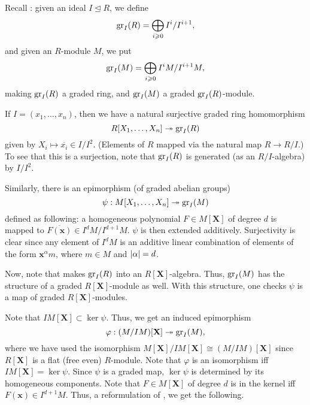 \documentclass[12pt]{article}
\begin{document}
Recall : given an ideal $I \unlhd R$, we define
\begin{equation*} 
	\operatorname{gr}_{I}(R) = \bigoplus_{i \geqslant 0} I^{i}/I^{i + 1},
\end{equation*}
and given an $R$-module $M$, we put
\begin{equation*}
	\operatorname{gr}_{I}(M) = \bigoplus_{i \geqslant 0} I^{i}M/I^{i + 1}M,
\end{equation*}
making $\operatorname{gr}_{I}(R)$ a graded ring, and $\operatorname{gr}_{I}(M)$ a graded $\operatorname{gr}_{I}(R)$-module.

If $I = (x_{1}, \ldots, x_{n})$, then we have a natural surjective graded ring homomorphism
\begin{equation} \label{eq:008}
	R[X_{1}, \ldots, X_{n}] \twoheadrightarrow \operatorname{gr}_{I}(R)
\end{equation}
given by $X_{i} \mapsto \overline{x_{i}} \in I/I^{2}$. (Elements of $R$ mapped via the natural map $R \to R/I$.) To see that this is a surjection, note that $\operatorname{gr}_{I}(R)$ is generated (as an $R/I$-algebra) by $I/I^{2}$.

Similarly, there is an epimorphism (of graded abelian groups)
\begin{equation*} 
	\psi : M[X_{1}, \ldots, X_{n}] \twoheadrightarrow \operatorname{gr}_{I}(M)
\end{equation*}
defined as following: a homogeneous polynomial $F \in M[\mathbf{X}]$ of degree $d$ is mapped to $\overline{F(\mathbf{x})} \in I^{d} M/I^{d + 1} M$. $\psi$ is then extended additively. Surjectivity is clear since any element of $I^{d} M$ is an additive linear combination of elements of the form $\mathbf{x}^{\alpha} m$, where $m \in M$ and ${\left\lvert \alpha \right\lvert} = d$.

Now, note that  makes $\operatorname{gr}_{I}(R)$ into an $R[\mathbf{X}]$-algebra. Thus, $\operatorname{gr}_{I}(M)$ has the structure of a graded $R[\mathbf{X}]$-module as well. With this structure, one checks $\psi$ is a map of graded $R[\mathbf{X}]$-modules.

Note that $IM[\mathbf{X}] \subset \ker \psi$. Thus, we get an induced epimorphism
\begin{equation*} 
	\varphi : (M/IM)[\mathbf{X}] \twoheadrightarrow \operatorname{gr}_{I}(M),
\end{equation*}
where we have used the isomorphism $M[\mathbf{X}]/IM[\mathbf{X}] \cong (M/IM)[\mathbf{X}]$ since $R[\mathbf{X}]$ is a flat (free even) $R$-module. Note that $\varphi$ is an isomorphism iff $IM[\mathbf{X}] = \ker \psi$. Since $\psi$ is a graded map, $\ker \psi$ is determined by its homogeneous components. Note that $F \in M[\mathbf{X}]$ of degree $d$ is in the kernel iff $F(\mathbf{x}) \in I^{d + 1} M$. Thus, a reformulation of , we get the following.
\end{document}
